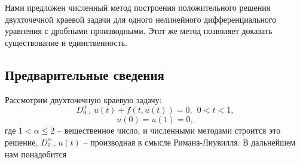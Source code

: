 Нами предложен численный метод построения положительного решения двухточечной краевой задачи для одного нелинейного дифференциального уравнения с дробными производными. Этот же метод позволяет доказать существование и единственность.



\subsection{Предварительные сведения}

Рассмотрим двухточечную краевую задачу:
\begin{equation}D^{\alpha }_{0+}u\left(t\right)+f\left(t,u\left(t\right)\right)=0,\ \ 0<t<1,\label{EIO1}\end{equation}
\begin{equation}u\left(0\right)=u\left(1\right)=0, \label{EIO2}\end{equation}
где $1<\alpha\le2$ -- вещественное число, и  численными методами строится это решение, $D^{\alpha }_{0+}u\left(t\right)$ -- производная в смысле Римана-Лиувилля.
В дальнейшем нам понадобится


